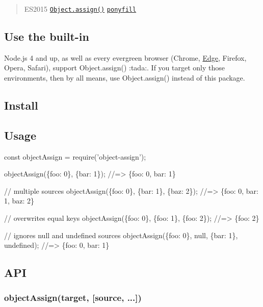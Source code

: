 \begin{quote}
E\+S2015 \href{http://www.2ality.com/2014/01/object-assign.html}{\tt {\ttfamily Object.\+assign()}} \href{https://ponyfill.com}{\tt ponyfill} \end{quote}


\subsection*{Use the built-\/in}

Node.\+js 4 and up, as well as every evergreen browser (Chrome, \mbox{\hyperlink{classEdge}{Edge}}, Firefox, Opera, Safari), support {\ttfamily Object.\+assign()} \+:tada\+:. If you target only those environments, then by all means, use {\ttfamily Object.\+assign()} instead of this package.

\subsection*{Install}




\subsection*{Usage}


\begin{DoxyCode}
const objectAssign = require('object-assign');

objectAssign(\{foo: 0\}, \{bar: 1\});
//=> \{foo: 0, bar: 1\}

// multiple sources
objectAssign(\{foo: 0\}, \{bar: 1\}, \{baz: 2\});
//=> \{foo: 0, bar: 1, baz: 2\}

// overwrites equal keys
objectAssign(\{foo: 0\}, \{foo: 1\}, \{foo: 2\});
//=> \{foo: 2\}

// ignores null and undefined sources
objectAssign(\{foo: 0\}, null, \{bar: 1\}, undefined);
//=> \{foo: 0, bar: 1\}
\end{DoxyCode}


\subsection*{A\+PI}

\subsubsection*{object\+Assign(target, \mbox{[}source, ...\mbox{]})}

